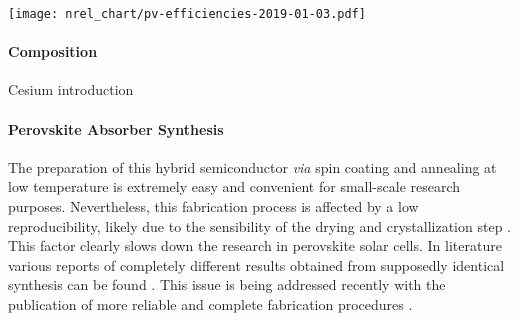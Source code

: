 	\begin{SCfigure}
		\centering
		\texttt{[image: nrel\_chart/pv-efficiencies-2019-01-03.pdf]}
		\label{fig:nrel_chart}
	\end{SCfigure}

	\paragraph{Composition}

	Cesium introduction \cite{Bi2016,Saliba2016}



	\paragraph{Perovskite Absorber Synthesis}
	The preparation of this hybrid semiconductor \textsl{via} spin coating and annealing at low temperature is extremely easy and convenient for small-scale research purposes.
	Nevertheless, this fabrication process is affected by a low reproducibility, likely due to the sensibility of the drying and crystallization step \cite{Pockett2015}.
	This factor clearly slows down the research in perovskite solar cells.
	In literature various reports of completely different results obtained from supposedly identical synthesis can be found \cite{Pockett2015,Gottesman2014}.
	This issue is being addressed recently with the publication of more reliable and complete fabrication procedures \cite{Saliba2018}.

